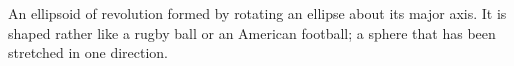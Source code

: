 An ellipsoid of revolution formed by rotating an ellipse about its major axis.
It is shaped rather like a rugby ball or an American football; a sphere that 
has been stretched in one direction.